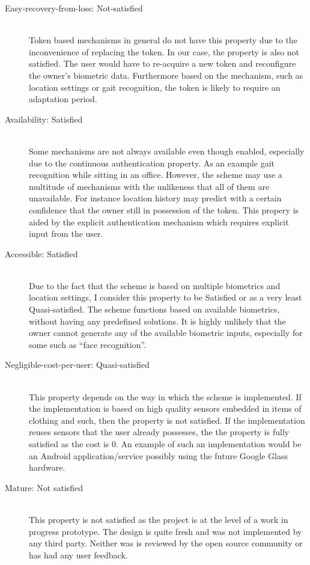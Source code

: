 \begin{description}
  \item[Easy-recovery-from-loss: Not-satisfied] \hfill \\
  Token based mechanisms in general do not have this property due to the inconvenience of replacing the token. In our case, the property is also not satisfied. The user would have to re-acquire a new token and reconfigure the owner's biometric data. Furthermore based on the mechanism, such as location settings or gait recognition, the token is likely to require an adaptation period.
  
  \item[Availability: Satisfied] \hfill \\
  Some mechanisms are not always available even though enabled, especially due to the continuous authentication property. As an example gait recognition while sitting in an office. However, the scheme may use a multitude of mechanisms with the unlikeness that all of them are unavailable. For instance location history may predict with a certain confidence that the owner still in possession of the token. This propery is aided by the explicit authentication mechanism which requires explicit input from the user.
  
  \item[Accessible: Satisfied] \hfill \\
  Due to the fact that the scheme is based on multiple biometrics and location settings, I consider this property to be Satisfied or as a very least Quasi-satisfied. The scheme functions based on available biometrics, without having any predefined solutions. It is highly unlikely that the owner cannot generate any of the available biometric inputs, especially for some such as ``face recognition''.
  
  \item[Negligible-cost-per-user: Quasi-satisfied] \hfill \\
  This property depends on the way in which the scheme is implemented. If the implementation is based on high quality sensors embedded in items of clothing and such, then the property is not satisfied. If the implementation reuses sensors that the user already possesses, the the property is fully satisfied as the cost is 0. An example of such an implementation would be an Android application/service possibly using the future Google Glass hardware.
  
  \item[Mature: Not satisfied] \hfill \\
  This property is not satisfied as the project is at the level of a work in progress prototype. The design is quite fresh and was not implemented by any third party. Neither was is reviewed by the open source community or has had any user feedback.
  

\end{description}
